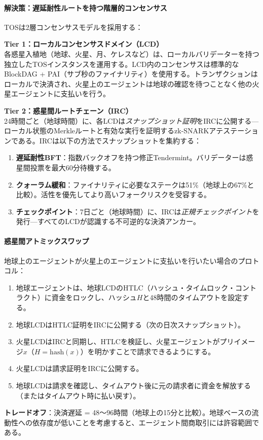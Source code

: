 \documentclass[11pt]{article}
\begin{document}
\paragraph{解決策：遅延耐性ルートを持つ階層的コンセンサス}
TOSは2層コンセンサスモデルを採用する：

\textbf{Tier 1：ローカルコンセンサスドメイン（LCD）}\\
各惑星入植地（地球、火星、月、ケレスなど）は、ローカルバリデーターを持つ独立したTOSインスタンスを運用する。LCD内のコンセンサスは標準的なBlockDAG + PAI（サブ秒のファイナリティ）を使用する。トランザクションはローカルで決済され、火星上のエージェントは地球の確認を待つことなく他の火星エージェントに支払いを行う。

\textbf{Tier 2：惑星間ルートチェーン（IRC）}\\
24時間ごと（地球時間）に、各LCDは\emph{スナップショット証明}をIRCに公開する—ローカル状態のMerkleルートと有効な実行を証明するzk-SNARKアテステーションである。IRCは以下の方法でスナップショットを集約する：
\begin{enumerate}[noitemsep]
  \item \textbf{遅延耐性BFT}：指数バックオフを持つ修正Tendermint。バリデーターは惑星間投票を最大60分待機する。
  \item \textbf{クォーラム緩和}：ファイナリティに必要なステークは51\%（地球上の67\%と比較）。活性を優先してより高いフォークリスクを受容する。
  \item \textbf{チェックポイント}：7日ごと（地球時間）に、IRCは\emph{正規チェックポイント}を発行—すべてのLCDが認識する不可逆的な決済アンカー。
\end{enumerate}

\paragraph{惑星間アトミックスワップ}
地球上のエージェントが火星上のエージェントに支払いを行いたい場合のプロトコル：
\begin{enumerate}[noitemsep]
  \item 地球エージェントは、地球LCDのHTLC（ハッシュ・タイムロック・コントラクト）に資金をロックし、ハッシュ$H$と48時間のタイムアウトを設定する。
  \item 地球LCDはHTLC証明をIRCに公開する（次の日次スナップショット）。
  \item 火星LCDはIRCと同期し、HTLCを検証し、火星エージェントがプリイメージ$x$（$H = \text{hash}(x)$）を明かすことで請求できるようにする。
  \item 火星LCDは請求証明をIRCに公開する。
  \item 地球LCDは請求を確認し、タイムアウト後に元の請求者に資金を解放する（またはタイムアウト時に払い戻す）。
\end{enumerate}
\textbf{トレードオフ}：決済遅延 = 48〜96時間（地球上の15分と比較）。地球ベースの流動性への依存度が低いことを考慮すると、エージェント間商取引には許容範囲である。
\end{document}
